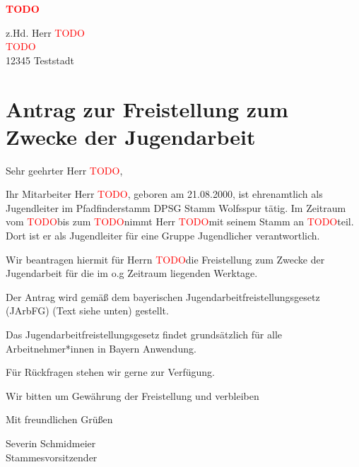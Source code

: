 \newcommand{\TODO}{\textcolor{red}{TODO}}

\textbf{\TODO}

z.Hd. Herr \TODO\\
\TODO\\
12345 Teststadt

\section*{Antrag zur Freistellung zum Zwecke der Jugendarbeit}
 
Sehr geehrter Herr \TODO, 


Ihr Mitarbeiter Herr \TODO, geboren am 21.08.2000, ist ehrenamtlich als Jugendleiter im Pfadfinderstamm DPSG Stamm Wolfsspur tätig. Im Zeitraum vom \TODO bis zum \TODO nimmt Herr \TODO mit seinem Stamm an \TODO teil. Dort ist er als Jugendleiter für eine Gruppe Jugendlicher verantwortlich.


Wir beantragen hiermit für Herrn \TODO die Freistellung zum Zwecke der Jugendarbeit für die im o.g Zeitraum liegenden Werktage.

Der Antrag wird gemäß dem bayerischen Jugendarbeitfreistellungsgesetz (JArbFG) (Text siehe unten) gestellt. 

Das Jugendarbeitfreistellungsgesetz findet grundsätzlich für alle Arbeitnehmer*innen in Bayern Anwendung. 



Für Rückfragen stehen wir gerne zur Verfügung. 



Wir bitten um Gewährung der Freistellung 
und verbleiben 



Mit freundlichen Grüßen 

Severin Schmidmeier\\
Stammesvorsitzender
